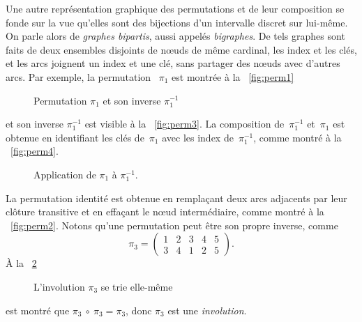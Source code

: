 Une autre représentation graphique des permutations et de leur
composition se fonde sur la vue
qu'elles sont des bijections d'un intervalle discret sur lui-même. On
parle alors de \emph{graphes bipartis}, aussi appelés
\emph{bigraphes}. De tels
graphes sont faits de deux ensembles disjoints de nœuds de même
cardinal, les index et les clés, et les arcs joignent un index et une
clé, sans partager des nœuds avec d'autres arcs. Par exemple, la
permutation ~\(\pi_1\) est montrée à la \fig~\vref{fig:perm1}
\begin{figure}
\centering
{}
\qquad\qquad
{}
\caption{Permutation \(\pi_1\) et son inverse \(\pi_1^{-1}\)}
\label{fig:pi_1}
\end{figure}
et son inverse \(\pi_1^{-1}\) est visible à la
\fig~\vref{fig:perm3}. La composition
de~\(\pi_1^{-1}\) et~\(\pi_1\) est obtenue en identifiant les clés
de~\(\pi_1\) avec les index de~\(\pi_1^{-1}\), comme montré à la
\fig~\vref{fig:perm4}.
\begin{figure}[t]
\centering
{}%
\qquad\qquad
{}
\caption{Application de \(\pi_1\) à \(\pi_1^{-1}\).}
\end{figure}
La permutation identité est obtenue en
remplaçant deux arcs adjacents par leur clôture transitive
 et en effaçant le nœud intermédiaire,
comme montré à la \fig~\vref{fig:perm2}. Notons qu'une permutation
peut être son propre inverse, comme
\begin{equation*}
\pi_3 =
\begin{pmatrix}
1 & 2 & 3 & 4 & 5\\
3 & 4 & 1 & 2 & 5
\end{pmatrix}.
\end{equation*}
À la \fig~\ref{fig:involution}
\begin{figure}
\centering
{}
\qquad\qquad
{}
\caption{L'involution \(\pi_3\) se trie elle-même}
\label{fig:involution}
\end{figure}
est montré que \(\pi_3~\circ~\pi_3 = \pi_3\), donc \(\pi_3\) est une
\emph{involution}.

